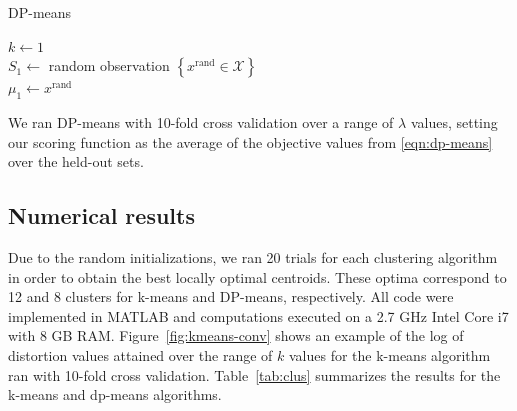 \documentclass[letterpaper,10 pt,conference]{ieeeconf}
\begin{document}
\begin{algorithm}[!htbp]
  \caption{DP-means}

  \DontPrintSemicolon

  
  
  \smallskip

  $k \leftarrow 1$ \\
  $S_{1} \leftarrow$ random observation $\left\{x^{\text{rand}}\in\mathcal{X}\right\}$ \\
  $\mu_{1} \leftarrow x^{\text{rand}}$


  \label{alg:dp-means}
\end{algorithm}

We ran DP-means with 10-fold cross validation over a range of $\lambda$ values, setting our scoring function as the average of the objective values from \eqref{eqn:dp-means} over the held-out sets.

\subsection{Numerical results}

Due to the random initializations, we ran 20 trials for each clustering algorithm in order to obtain the best locally optimal centroids. These optima correspond to 12 and 8 clusters for k-means and DP-means, respectively. All code were implemented in MATLAB and computations executed on a 2.7 GHz Intel Core i7 with 8 GB RAM. Figure~\ref{fig:kmeans-conv} shows an example of the log of distortion values attained over the range of $k$ values for the k-means algorithm ran with 10-fold cross validation. Table~\ref{tab:clus} summarizes the results for the k-means and dp-means algorithms. 
\end{document}
